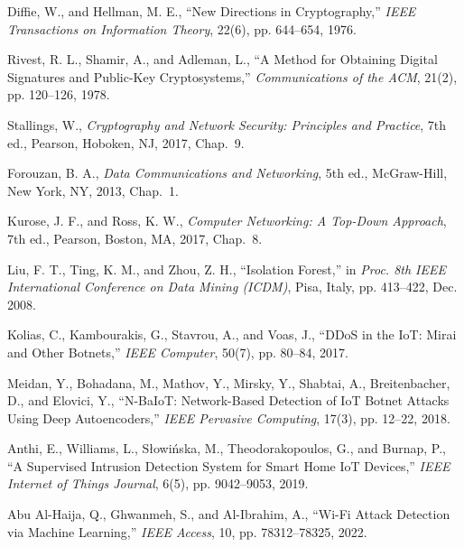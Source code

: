 \documentclass[11pt,a4paper]{report}
\begin{document}
\begin{enumerate}[label={[\arabic*]},leftmargin=*,itemsep=3pt,parsep=0pt,topsep=2pt]
    \item Diffie, W., and Hellman, M. E., ``New Directions in Cryptography,'' \textit{IEEE Transactions on Information Theory}, 22(6), pp. 644--654, 1976.
    \item Rivest, R. L., Shamir, A., and Adleman, L., ``A Method for Obtaining Digital Signatures and Public-Key Cryptosystems,'' \textit{Communications of the ACM}, 21(2), pp. 120--126, 1978.
    \item Stallings, W., \textit{Cryptography and Network Security: Principles and Practice}, 7th ed., Pearson, Hoboken, NJ, 2017, Chap.~9.
    \item Forouzan, B. A., \textit{Data Communications and Networking}, 5th ed., McGraw-Hill, New York, NY, 2013, Chap.~1.
    \item Kurose, J. F., and Ross, K. W., \textit{Computer Networking: A Top-Down Approach}, 7th ed., Pearson, Boston, MA, 2017, Chap.~8.
    \item Liu, F. T., Ting, K. M., and Zhou, Z. H., ``Isolation Forest,'' in \textit{Proc. 8th IEEE International Conference on Data Mining (ICDM)}, Pisa, Italy, pp. 413--422, Dec. 2008.
    \item Kolias, C., Kambourakis, G., Stavrou, A., and Voas, J., ``DDoS in the IoT: Mirai and Other Botnets,'' \textit{IEEE Computer}, 50(7), pp. 80--84, 2017.
    \item Meidan, Y., Bohadana, M., Mathov, Y., Mirsky, Y., Shabtai, A., Breitenbacher, D., and Elovici, Y., ``N-BaIoT: Network-Based Detection of IoT Botnet Attacks Using Deep Autoencoders,'' \textit{IEEE Pervasive Computing}, 17(3), pp. 12--22, 2018.
    \item Anthi, E., Williams, L., S{\l}owi{\'n}ska, M., Theodorakopoulos, G., and Burnap, P., ``A Supervised Intrusion Detection System for Smart Home IoT Devices,'' \textit{IEEE Internet of Things Journal}, 6(5), pp. 9042--9053, 2019.
    \item Abu Al-Haija, Q., Ghwanmeh, S., and Al-Ibrahim, A., ``Wi-Fi Attack Detection via Machine Learning,'' \textit{IEEE Access}, 10, pp. 78312--78325, 2022.
\end{enumerate}

\clearpage

\end{document}
